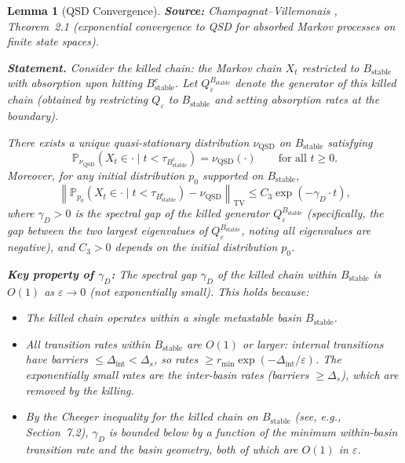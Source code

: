\documentclass[11pt]{article}
\newtheorem{lemma}{Lemma}
\newcommand{\eps}{\varepsilon}
\newcommand{\Ds}{\Delta_s}
\newcommand{\Bstable}{B_{\mathrm{stable}}}
\newcommand{\TV}{\mathrm{TV}}
\newcommand{\QSD}{\mathrm{QSD}}
\begin{document}
\begin{lemma}[QSD Convergence]\label{lem:qsd}
\textbf{Source:} Champagnat--Villemonais \cite{CV16}, Theorem~2.1
(exponential convergence to QSD for absorbed Markov processes on
finite state spaces).

\medskip
\textbf{Statement.}
Consider the killed chain: the Markov chain $X_t$ restricted to
$\Bstable$ with absorption upon hitting $\Bstable^c$. Let
$Q_\eps^{\Bstable}$ denote the generator of this killed chain
(obtained by restricting $Q_\eps$ to $\Bstable$ and setting
absorption rates at the boundary).

There exists a unique quasi-stationary distribution
$\nu_\QSD$ on $\Bstable$ satisfying
\[
  \mathbb{P}_{\nu_\QSD}(X_t \in \cdot \mid t < \tau_{\Bstable^c})
  = \nu_\QSD(\cdot)
  \qquad \text{for all } t \geq 0.
\]
Moreover, for any initial distribution $p_0$ supported on $\Bstable$,
\begin{equation}\label{eq:qsd-convergence}
  \left\|\mathbb{P}_{p_0}(X_t \in \cdot \mid t < \tau_{\Bstable^c})
  - \nu_\QSD\right\|_{\TV}
  \leq C_3 \exp(-\gamma_D \cdot t),
\end{equation}
where $\gamma_D > 0$ is the spectral gap of the killed generator
$Q_\eps^{\Bstable}$ (specifically, the gap between the two
largest eigenvalues of $Q_\eps^{\Bstable}$, noting all eigenvalues
are negative), and $C_3 > 0$ depends on the initial distribution
$p_0$.

\medskip
\textbf{Key property of $\gamma_D$:}
The spectral gap $\gamma_D$ of the killed chain within $\Bstable$
is $O(1)$ as $\eps \to 0$ (not exponentially small). This holds
because:
\begin{itemize}
\item The killed chain operates within a single metastable basin
  $\Bstable$.
\item All transition rates \emph{within} $\Bstable$ are $O(1)$ or
  larger: internal transitions have barriers $\leq \Delta_{\mathrm{int}}
  < \Ds$, so rates $\geq r_{\min} \exp(-\Delta_{\mathrm{int}}/\eps)$.
  The exponentially small rates are the \emph{inter-basin} rates
  (barriers $\geq \Ds$), which are removed by the killing.
\item By the Cheeger inequality for the killed chain on $\Bstable$
  (see, e.g., \cite{BdH15} Section~7.2), $\gamma_D$ is bounded below
  by a function of the minimum within-basin transition rate and the
  basin geometry, both of which are $O(1)$ in $\eps$.
\end{itemize}


\end{lemma}
\end{document}
